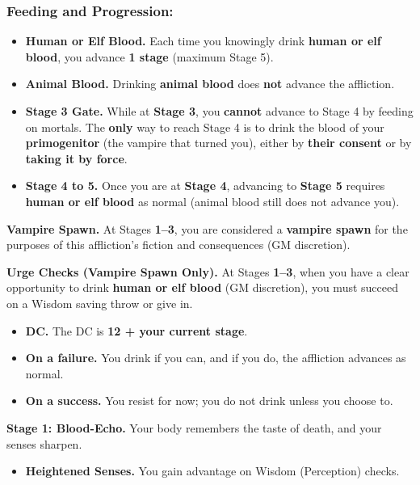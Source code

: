 \documentclass[letterpaper,twocolumn,openany,nodeprecatedcode,breakable,skins,xparse,most]{dndbook}
\begin{document}
\subsubsection{Feeding and Progression:}
\begin{itemize}
\item \textbf{Human or Elf Blood.} Each time you knowingly drink \textbf{human or elf blood}, you advance \textbf{1 stage} (maximum Stage 5).
\item \textbf{Animal Blood.} Drinking \textbf{animal blood} does \textbf{not} advance the affliction.
\item \textbf{Stage 3 Gate.} While at \textbf{Stage 3}, you \textbf{cannot} advance to Stage 4 by feeding on mortals. The \textbf{only} way to reach Stage 4 is to drink the blood of your \textbf{primogenitor} (the vampire that turned you), either by \textbf{their consent} or by \textbf{taking it by force}.
\item \textbf{Stage 4 to 5.} Once you are at \textbf{Stage 4}, advancing to \textbf{Stage 5} requires \textbf{human or elf blood} as normal (animal blood still does not advance you).
\end{itemize}

\textbf{Vampire Spawn.} At Stages \textbf{1--3}, you are considered a \textbf{vampire spawn} for the purposes of this affliction's fiction and consequences (GM discretion).

\textbf{Urge Checks (Vampire Spawn Only).} At Stages \textbf{1--3}, when you have a clear opportunity to drink \textbf{human or elf blood} (GM discretion), you must succeed on a Wisdom saving throw or give in.
\begin{itemize}
\item \textbf{DC.} The DC is \textbf{12 + your current stage}.
\item \textbf{On a failure.} You drink if you can, and if you do, the affliction advances as normal.
\item \textbf{On a success.} You resist for now; you do not drink unless you choose to.
\end{itemize}

\medskip

\textbf{Stage 1: Blood-Echo.}
Your body remembers the taste of death, and your senses sharpen.
\begin{itemize}
\item \textbf{Heightened Senses.} You gain advantage on Wisdom (Perception) checks.
\end{itemize}
\end{document}
